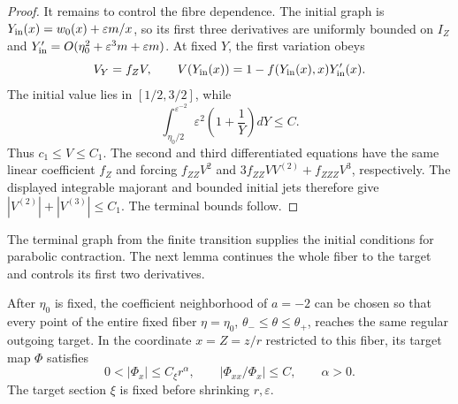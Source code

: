 \begin{proof}
It remains to control the fibre dependence.  The initial graph is
$Y_{\rm in}(x)=w_0(x)+\varepsilon m/x$, so its first three derivatives
are uniformly bounded on $I_Z$ and
$Y_{\rm in}'=O(\eta _0^2+\varepsilon^3m+\varepsilon m)$.
At fixed $Y$, the first variation obeys
\[
 V_Y=f_ZV,\qquad
 V(Y_{\rm in}(x))=1-f(Y_{\rm in}(x),x)Y_{\rm in}'(x).
\]
The initial value lies in $[1/2,3/2]$, while
\[
 \int_{\eta _0/2}^{\varepsilon^{-2}}
 \varepsilon^2\left(1+\frac1Y\right)dY\le C.
\]
Thus $c_1\le V\le C_1$.  The second and third differentiated equations have the same linear
coefficient $f_Z$ and forcing $f_{ZZ}V^2$ and
$3f_{ZZ}VV^{(2)}+f_{ZZZ}V^3$, respectively. The displayed integrable
majorant and bounded initial jets therefore give
$|V^{(2)}|+|V^{(3)}|\le C_1$.
The terminal bounds follow.
\end{proof}

The terminal graph from the finite transition supplies the initial
conditions for parabolic contraction. The next lemma continues the
whole fiber to the target and controls its first two derivatives.

\begin{lemma}
\label{lem:pc-fast-cone}
After $\eta_0$ is fixed, the coefficient neighborhood of $a=-2$
can be chosen so that every point of the entire fixed fiber
$\eta=\eta_0$, $\theta_-\le\theta\le\theta_+$, reaches the same
regular outgoing target. In the coordinate $x=Z=z/r$ restricted to
this fiber, its target map $\Phi$ satisfies
\begin{equation}
\label{eq:pc-fiber-target}
 0<|\Phi_x|\le C_\xi r^\alpha,\qquad
 |\Phi_{xx}/\Phi_x|\le C,\qquad \alpha>0.
\end{equation}
The target section $\xi$ is fixed before shrinking $r,\varepsilon$.
\end{lemma}

